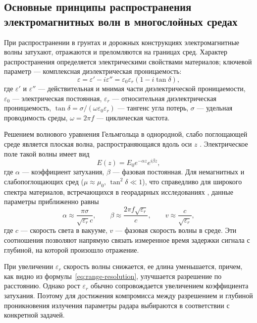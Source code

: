 \subsection{Основные принципы распространения электромагнитных волн в многослойных средах}

При распространении в грунтах и дорожных конструкциях электромагнитные волны затухают, отражаются и преломляются на границах сред. Характер распространения определяется электрическими свойствами материалов; ключевой параметр --- комплексная диэлектрическая проницаемость:
\begin{equation}
    \varepsilon = \varepsilon' - i \varepsilon''
    = \varepsilon_0 \varepsilon_r (1 - i \tan\delta),
\end{equation}
где $\varepsilon'$ и $\varepsilon''$ --- действительная и мнимая части диэлектрической проницаемости, $\varepsilon_0$ --- электрическая постоянная, $\varepsilon_r$ --- относительная диэлектрическая проницаемость, $\tan\delta = \sigma/(\omega\varepsilon_0\varepsilon_r)$ --- тангенс угла потерь, $\sigma$ --- удельная проводимость среды, $\omega = 2\pi f$ --- циклическая частота.

Решением волнового уравнения Гельмгольца в однородной, слабо поглощающей среде является плоская волна, распространяющаяся вдоль оси $z$ \cite{ulaby1981microwave}. Электрическое поле такой волны имеет вид
\begin{equation}
    E(z) = E_0 e^{-\alpha z} e^{i \beta z},
\end{equation}
где $\alpha$ --- коэффициент затухания, $\beta$ --- фазовая постоянная. Для немагнитных и слабопоглощающих сред ($\mu \approx \mu_0$, $\tan^2\delta \ll 1$), что справедливо для широкого спектра материалов, встречающихся в георадарных исследованиях \cite{church1988dielectric}, данные параметры приближенно равны
\begin{equation}
    \alpha \approx \frac{\pi \sigma}{\sqrt{\varepsilon_r}c}, \qquad
    \beta \approx \frac{2\pi f\sqrt{\varepsilon_r}}{c}, \qquad
    v \approx \frac{c}{\sqrt{\varepsilon_r}},
\end{equation}
где $c$ --- скорость света в вакууме, $v$ --- фазовая скорость волны в среде. Эти соотношения позволяют напрямую связать измеренное время задержки сигнала с глубиной, на которой произошло отражение.

При увеличении $\varepsilon_r$ скорость волны снижается, ее длина уменьшается, причем, как видно из формулы~\eqref{eq:range-resolution}, улучшается разрешение по расстоянию. Однако рост $\varepsilon_r$ обычно сопровождается увеличением коэффициента затухания. Поэтому для достижения компромисса между разрешением и глубиной проникновения излучения параметры радара выбираются в соответствии с конкретной задачей.

